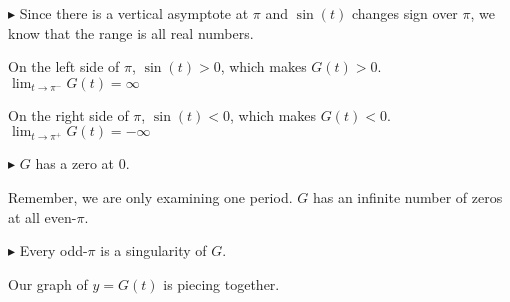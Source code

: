 \documentclass{ximera}
\begin{document}
$\blacktriangleright$  Since there is a vertical asymptote at $\pi$ and $\sin(t)$ changes sign over $\pi$, we know that the range is all real numbers.


On the left side of $\pi$, $\sin(t) > 0$, which makes $G(t) > 0$.   $\lim_{t \to \pi^{-}}G(t) = \infty$ 

On the right side of $\pi$, $\sin(t) < 0$, which makes $G(t) < 0$.   $\lim_{t \to \pi^{+}}G(t) = -\infty$ 







$\blacktriangleright$ $G$ has a zero at $0$.  

Remember, we are only examining one period.  $G$ has an infinite number of zeros at all even-$\pi$.





$\blacktriangleright$ Every odd-$\pi$ is a singularity of $G$.




Our graph of $y=G(t)$ is piecing together.
\end{document}
